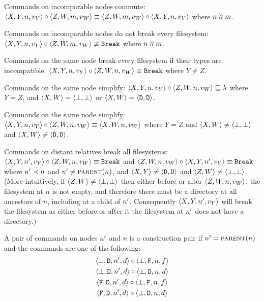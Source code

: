 \begin{myax}\label{ax_separate_commute}
Commands on incomparable nodes commute:
$\cxynv\cc\czwmv \equiv \czwmv\cc\cxynv$ where $n\unrel m$.
\end{myax}

\begin{myax}\label{ax_separate_nobreaks}
Commands on incomparable nodes do not break every filesystem:
$\cxynv\cc\czwmv \nequiv \cbrk$ where $n\unrel m$.
\end{myax}

\begin{myax}\label{ax_same_breaks}
Commands on the same node break every filesystem if their types are incompatible:
$\cxynv\cc\czwnv \equiv \cbrk$ where $Y\ne Z$.
\end{myax}

\begin{myax}\label{ax_same_emptyseq}
Commands on the same node simplify:
$\cxynv\cc\czwnv \eqext \emptyseq$ where $Y=Z$, and $\cxw=\cbb$ 
or $\cxw=\cdd$.
\end{myax}

\begin{myax}\label{ax_same_singlec}
Commands on the same node simplify:
$\cxynv\cc \czwnv \equiv \cxwnv$ where $Y=Z$ and $\cxw\neq\cbb$ and $\cxw\neq\cdd$.
\end{myax}

\begin{myax}\label{ax_distantrel_breaks}
Commands on distant relatives break all filesystems:
$\cxynnv\cc\czwnv \equiv \cbrk$
and $\czwnv\cc\cxynnv \equiv\cbrk$
where $\nn\descendant n$ and $\nn\neq\parent(n)$, and $\cxy\neq\cdd$ and $\czw\neq\cbb$.
(More intuitively, if $\czw\neq\cbb$ then either before or after $\czwnv$, the filesystem at
$n$ is not empty, and therefore there must be a directory at all ancestors of $n$, including at a child of $\nn$.
Consequently $\cxynnv$ will break the filesystem as either before or after it the filesystem at $\nn$
does not have a directory.)
\end{myax}

\begin{mydef}
A pair of commands on nodes $\nn$ and $n$ is a construction pair if $\nn=\parent(n)$ 
and the commands are one
of the following:
   \begin{gather*}
            \cbdaa{\nn}{\vald}\cc  \cbfaa{n}{\valf} \\
            \cbdaa{\nn}{\vald}\cc  \cbdaa{n}{\vald} \\
            \cfdaa{\nn}{\vald}\cc  \cbfaa{n}{\valf} \\
            \cfdaa{\nn}{\vald}\cc  \cbdaa{n}{\vald}
   \end{gather*}
\end{mydef}

